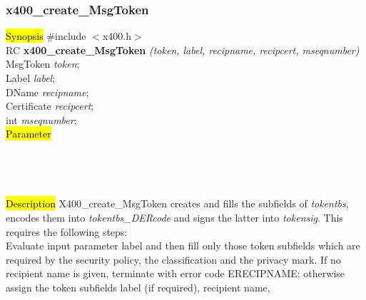 \subsubsection{x400\_create\_MsgToken}
\label{x4_cr_MTok}
\hl{Synopsis}
\#include $<$x400.h$>$ \\ [1ex]
RC {\bf x400\_create\_MsgToken}
{\em (token, label, recipname, recipcert, mseqnumber)} \\
MsgToken {\em *token};  \\
Label {\em *label}; \\
DName {\em *recipname}; \\
Certificate {\em *recipcert}; \\
int {\em *mseqnumber};    \\
\hl{Parameter}
 \\[1ex]
 \\[1ex]
 \\[1ex]
 \\[1ex]
 \\[1ex]
\hl{Description}
X400\_create\_MsgToken
creates and fills the subfields of {\em token\pf tbs},
encodes them into {\em token\pf tbs\_DERcode} and
signs the latter into {\em token\pf sig}.
This requires the following steps:
\\
Evaluate input parameter label and then fill only those
token subfields which are required by the security policy,
the classification and the privacy mark.
If no recipient name is given, terminate with error code ERECIPNAME;
otherwise assign the token subfields
label (if required), recipient name,
